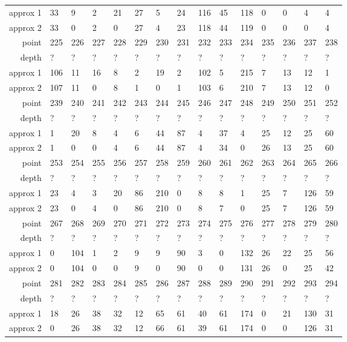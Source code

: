 \begin{center}
\begin{supertabular}{|r|l l l l l l l l l l l l l l|}
approx 1 & 33 & 9 & 2 & 21 & 27 & 5 & 24 & 116 & 45 & 118 & 0 & 0 & 4 & 4 \\
approx 2 & 33 & 0 & 2 & 0 & 27 & 4 & 23 & 118 & 44 & 119 & 0 & 0 & 0 & 4 \\
\hline
point & 225 & 226 & 227 & 228 & 229 & 230 & 231 & 232 & 233 & 234 & 235 & 236 & 237 & 238 \\
\hline
depth & ? & ? & ? & ? & ? & ? & ? & ? & ? & ? & ? & ? & ? & ? \\
approx 1 & 106 & 11 & 16 & 8 & 2 & 19 & 2 & 102 & 5 & 215 & 7 & 13 & 12 & 1 \\
approx 2 & 107 & 11 & 0 & 8 & 1 & 0 & 1 & 103 & 6 & 210 & 7 & 13 & 12 & 0 \\
\hline
point & 239 & 240 & 241 & 242 & 243 & 244 & 245 & 246 & 247 & 248 & 249 & 250 & 251 & 252 \\
\hline
depth & ? & ? & ? & ? & ? & ? & ? & ? & ? & ? & ? & ? & ? & ? \\
approx 1 & 1 & 20 & 8 & 4 & 6 & 44 & 87 & 4 & 37 & 4 & 25 & 12 & 25 & 60 \\
approx 2 & 1 & 0 & 0 & 4 & 6 & 44 & 87 & 4 & 34 & 0 & 26 & 13 & 25 & 60 \\
\hline
point & 253 & 254 & 255 & 256 & 257 & 258 & 259 & 260 & 261 & 262 & 263 & 264 & 265 & 266 \\
\hline
depth & ? & ? & ? & ? & ? & ? & ? & ? & ? & ? & ? & ? & ? & ? \\
approx 1 & 23 & 4 & 3 & 20 & 86 & 210 & 0 & 8 & 8 & 1 & 25 & 7 & 126 & 59 \\
approx 2 & 23 & 0 & 4 & 0 & 86 & 210 & 0 & 8 & 7 & 0 & 25 & 7 & 126 & 59 \\
\hline
point & 267 & 268 & 269 & 270 & 271 & 272 & 273 & 274 & 275 & 276 & 277 & 278 & 279 & 280 \\
\hline
depth & ? & ? & ? & ? & ? & ? & ? & ? & ? & ? & ? & ? & ? & ? \\
approx 1 & 0 & 104 & 1 & 2 & 9 & 9 & 90 & 3 & 0 & 132 & 26 & 22 & 25 & 56 \\
approx 2 & 0 & 104 & 0 & 0 & 9 & 0 & 90 & 0 & 0 & 131 & 26 & 0 & 25 & 42 \\
\hline
point & 281 & 282 & 283 & 284 & 285 & 286 & 287 & 288 & 289 & 290 & 291 & 292 & 293 & 294 \\
\hline
depth & ? & ? & ? & ? & ? & ? & ? & ? & ? & ? & ? & ? & ? & ? \\
approx 1 & 18 & 26 & 38 & 32 & 12 & 65 & 61 & 40 & 61 & 174 & 0 & 21 & 130 & 31 \\
approx 2 & 0 & 26 & 38 & 32 & 12 & 66 & 61 & 39 & 61 & 174 & 0 & 0 & 126 & 31 \\

\end{supertabular}
\end{center}
